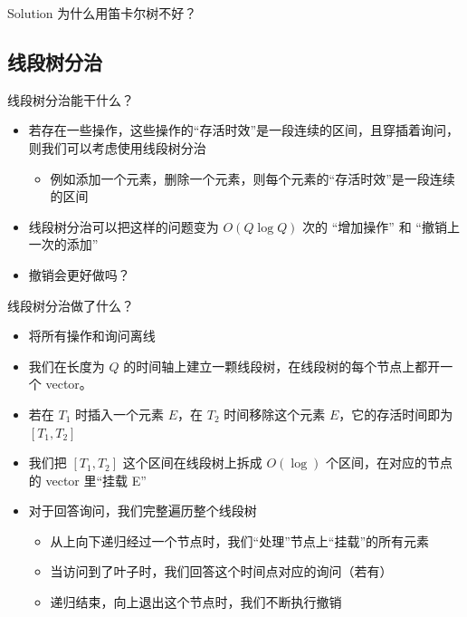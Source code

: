 ﻿\documentclass[aspectratio=169,handout]{ctexbeamer}
\begin{document}
\begin{frame}{Solution}
    为什么用笛卡尔树不好？
\end{frame}











\subsection{线段树分治}

\begin{frame}{线段树分治能干什么？}
    \begin{itemize}
        \item 若存在一些操作，这些操作的“存活时效”是一段连续的区间，且穿插着询问，则我们可以考虑使用线段树分治
        \begin{itemize}
            \item 例如添加一个元素，删除一个元素，则每个元素的“存活时效”是一段连续的区间
        \end{itemize}
        \item 线段树分治可以把这样的问题变为 $O(Q\log Q)$ 次的 “增加操作” 和 “撤销上一次的添加”
        \item 撤销会更好做吗？ 
    \end{itemize}
\end{frame}

\begin{frame}{线段树分治做了什么？}
    \begin{itemize}
        \item 将所有操作和询问离线
        \item 我们在长度为 $Q$ 的时间轴上建立一颗线段树，在线段树的\textcolor{peaking}{每个}节点上都开一个 vector。
        \item 若在 $T_1$ 时插入一个元素 $E$，在 $T_2$ 时间移除这个元素 $E$，它的存活时间即为 $[T_1,T_2]$
        \item 我们把 $[T_1,T_2]$ 这个区间在线段树上拆成 $O(\log)$ 个区间，在对应的节点的 vector 里“挂载 E”
        \item 对于回答询问，我们完整遍历整个线段树
        \begin{itemize}
            \item 从上向下递归经过一个节点时，我们“处理”节点上“挂载”的所有元素
            \item 当访问到了叶子时，我们回答这个时间点对应的询问（若有）
            \item 递归结束，向上退出这个节点时，我们不断执行撤销
        \end{itemize}
    \end{itemize}
\end{frame}
\end{document}
